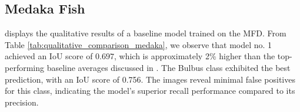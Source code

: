 \subsection{Medaka Fish}

 displays the qualitative results of a baseline model trained on the \acf{MFD}. From Table \ref{tab:qualitative_comparison_medaka}, we observe that model no. 1 achieved an \ac{IoU} score of $0.697$, which is approximately 2\% higher than the top-performing baseline averages discussed in . The Bulbus class exhibited the best prediction, with an \ac{IoU} score of 0.756. The images reveal minimal false positives for this class, indicating the model's superior recall performance compared to its precision.
\begin{figure}[H]%
  \centering  

\end{figure}

